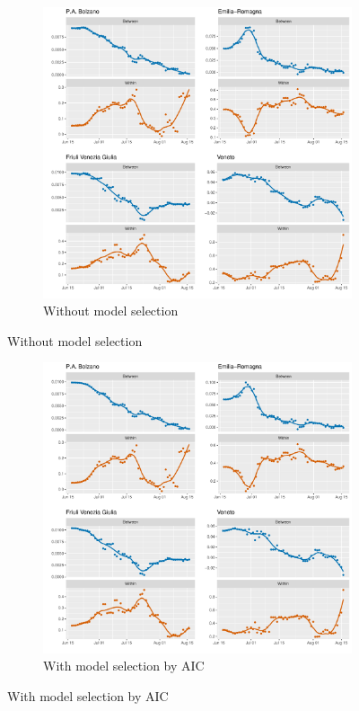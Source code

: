 \documentclass[12pt]{article}
\begin{document}
    \begin{figure}[H]
	    \centering
	    \begin{subfigure}{\textwidth}
	      \centering
	      \includegraphics[width=\linewidth]{output/model_between_lag14_betas_Nord-Est_rolling.pdf}
	      \caption{Without model selection}
	      \label{fig:beta_between_over_time_nordest_regular}
	    \end{subfigure}
    \end{figure}
    \begin{figure}[H]\ContinuedFloat
	    \begin{subfigure}{\textwidth}
	      \centering
	      \includegraphics[width=\linewidth]{output/model_between_lag14_betas_Nord-Est_aic_rolling.pdf}
	      \caption{With model selection by AIC}
	      \label{fig:beta_between_over_time_nordest_aic}
	    \end{subfigure}
	\end{figure}
\end{document}

